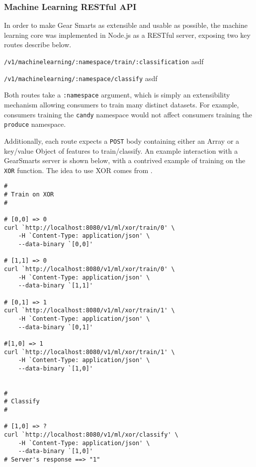 \subsubsection{Machine Learning RESTful API}
\label{subsction:mlapi}
In order to make Gear Smarts as extensible and usable as possible, the machine learning core was implemented in Node.js
as a RESTful server, exposing two key routes describe below.

\begin{description}
    \item{\texttt{/v1/machinelearning/:namespace/train/:classification}} asdf
    \item{\texttt{/v1/machinelearning/:namespace/classify}} asdf
\end{description}

Both routes take a \texttt{:namespace} argument, which is simply an extensibility mechanism allowing consumers to train
many distinct datasets. For example, consumers training the \texttt{candy} namespace would not affect consumers training
the \texttt{produce} namespace.

Additionally, each route expects a \texttt{POST} body containing either an Array or a key/value Object of features to
train/classify. An example interaction with a GearSmarts server is shown below, with a contrived example of training
on the \texttt{XOR} function. The idea to use XOR comes from \cite{Github:nodesvm}.

\begin{lstlisting}
#
# Train on XOR
#

# [0,0] => 0
curl `http://localhost:8080/v1/ml/xor/train/0' \
    -H `Content-Type: application/json' \
    --data-binary `[0,0]'

# [1,1] => 0
curl `http://localhost:8080/v1/ml/xor/train/0' \
    -H `Content-Type: application/json' \
    --data-binary `[1,1]'

# [0,1] => 1
curl `http://localhost:8080/v1/ml/xor/train/1' \
    -H `Content-Type: application/json' \
    --data-binary `[0,1]'

#[1,0] => 1
curl `http://localhost:8080/v1/ml/xor/train/1' \
    -H `Content-Type: application/json' \
    --data-binary `[1,0]'


#
# Classify
#

# [1,0] => ?
curl `http://localhost:8080/v1/ml/xor/classify' \
    -H `Content-Type: application/json' \
    --data-binary `[1,0]'
# Server's response ==> "1"
\end{lstlisting}


